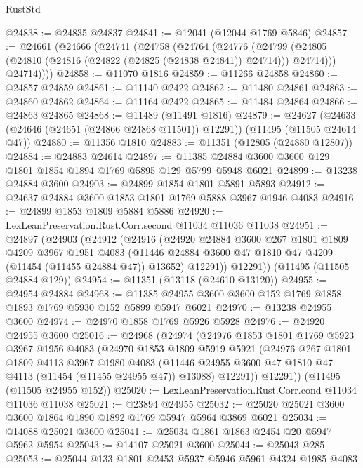 \begin{lexlean}{RustStd}
\begin{coremodule}
@24838 := @24835 @24837
@24841 := @12041 (@12044 @1769 @5846)
@24857 := @24661
    (@24666
      (@24741
        (@24758
          (@24764
            (@24776
              (@24799 (@24805 (@24810 (@24816 (@24822 (@24825 (@24838 @24841)) @24714))) @24714)))
            @24714))))
@24858 := @11070 @1816
@24859 := @11266 @24858
@24860 := @24857 @24859
@24861 := @11140 @2422
@24862 := @11480 @24861
@24863 := @24860 @24862
@24864 := @11164 @2422
@24865 := @11484 @24864
@24866 := @24863 @24865
@24868 := @11489 (@11491 @1816)
@24879 := @24627
    (@24633 (@24646 (@24651 (@24866 @24868 @11501)) @12291))
    (@11495 (@11505 @24614 @47))
@24880 := @11356 @1810
@24883 := @11351 (@12805 (@24880 @12807))
@24884 := @24883 @24614
@24897 := @11385 @24884 @3600 @3600 @129 @1801 @1854 @1894 @1769 @5895 @129 @5799 @5948 @6021
@24899 := @13238 @24884 @3600
@24903 := @24899 @1854 @1801 @5891 @5893
@24912 := @24637 @24884 @3600 @1853 @1801 @1769 @5888 @3967 @1946 @4083
@24916 := @24899 @1853 @1809 @5884 @5886
@24920 := LexLeanPreservation.Rust.Corr.second @11034 @11036 @11038
@24951 := @24897
    (@24903
      (@24912
        (@24916
          (@24920
            @24884
            @3600
            @267
            @1801
            @1809
            @4209
            @3967
            @1951
            @4083
            (@11446 @24884 @3600 @47 @1810 @47 @4209 (@11454 (@11455 @24884 @47)) @13652)
            @12291))
        @12291))
    (@11495 (@11505 @24884 @129))
@24954 := @11351 (@13118 (@24610 @13120))
@24955 := @24954 @24884
@24968 := @11385 @24955 @3600 @3600 @152 @1769 @1858 @1893 @1769 @5930 @152 @5899 @5947 @6021
@24970 := @13238 @24955 @3600
@24974 := @24970 @1858 @1769 @5926 @5928
@24976 := @24920 @24955 @3600
@25016 := @24968
    (@24974
      (@24976
        @1853
        @1801
        @1769
        @5923
        @3967
        @1956
        @4083
        (@24970
          @1853
          @1809
          @5919
          @5921
          (@24976
            @267
            @1801
            @1809
            @4113
            @3967
            @1980
            @4083
            (@11446 @24955 @3600 @47 @1810 @47 @4113 (@11454 (@11455 @24955 @47)) @13088)
            @12291))
        @12291))
    (@11495 (@11505 @24955 @152))
@25020 := LexLeanPreservation.Rust.Corr.cond @11034 @11036 @11038
@25021 := @23894 @24955
@25032 := @25020 @25021 @3600 @3600 @1864 @1890 @1892 @1769 @5947 @5964 @3869 @6021
@25034 := @14088 @25021 @3600
@25041 := @25034 @1861 @1863 @2454 @20 @5947 @5962 @5954
@25043 := @14107 @25021 @3600
@25044 := @25043 @285
@25053 := @25044 @133 @1801 @2453 @5937 @5946 @5961 @4324 @1985 @4083

\end{coremodule}
\end{lexlean}
